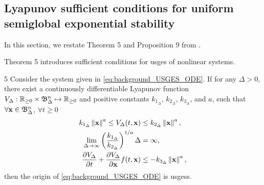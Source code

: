 \subsection{Lyapunov sufficient conditions for uniform semiglobal exponential stability}
In this section, we restate Theorem 5 and Proposition 9 from \cite{pettersen_lyapunov_2017}.

Theorem 5 introduces sufficient conditions for \acrfull{usges} of nonlinear systems.
\begin{customthm}{5 \cite{pettersen_lyapunov_2017}}
    \label{thm:background_USGES}
    Consider the system given in \eqref{eq:background_USGES_ODE}.
    If for any $\Delta > 0$, there exist a continuously differentiable Lyapunov function $V_{\Delta} : \mathbb{R}_{\geq 0} \times \mathfrak{B}_{\Delta}^{n} \mapsto \mathbb{R}_{\geq 0}$ and positive constants $k_{1_\Delta}$, $k_{2_\Delta}$, $k_{3_\Delta}$, and $a$, such that $\forall \mathbf{x} \in \mathfrak{B}_{\Delta}^{n}$, $\forall t \geq 0$
    \begin{subequations}
        \begin{align}
            k_{1_\Delta} \left\|\mathbf{x}\right\|^a \leq V_{\Delta}(t, \mathbf{x}) &\leq k_{2_\Delta} \left\|\mathbf{x}\right\|^a, \\
            \lim_{\Delta \rightarrow \infty} \left(\frac{k_{1_\Delta}}{k_{2_\Delta}}\right)^{1/a} \Delta &= \infty, \\
            \frac{\partial V_{\Delta}}{\partial t} + \frac{\partial V_{\Delta}}{\partial \mathbf{x}} f(t, \mathbf{x}) &\leq -k_{3_\Delta} \left\|\mathbf{x}\right\|^a,
        \end{align}
    \end{subequations}
    then the origin of \eqref{eq:background_USGES_ODE} is \glspl{usges}.
\end{customthm}

